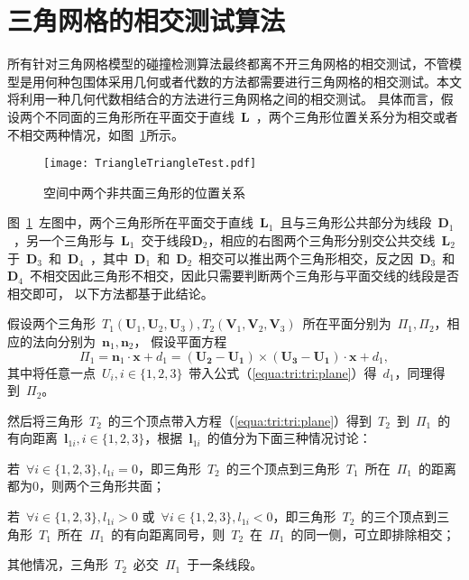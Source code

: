 \section{三角网格的相交测试算法}
\label{sec:intersection:triangles}

所有针对三角网格模型的碰撞检测算法最终都离不开三角网格的相交测试，不管模型是用何种包围体采用几何或者代数的方法都需要进行三角网格的相交测试。本文将利用一种几何代数相结合的方法进行三角网格之间的相交测试。
具体而言，假设两个不同面的三角形所在平面交于直线~$\bm{L}$~，两个三角形位置关系分为相交或者不相交两种情况，如图~\ref{fig:two:triangle:ui}所示。

\begin{figure}[H]
  \centering
    \texttt{[image: TriangleTriangleTest.pdf]}
    \caption{空间中两个非共面三角形的位置关系\cite{Moller1997}}
  \label{fig:two:triangle:ui}
\end{figure}

图~\ref{fig:two:triangle:ui}~左图中，两个三角形所在平面交于直线~$\bm{L}_1$~且与三角形公共部分为线段~$\bm{D}_1$~，另一个三角形与~$\bm{L}_1$~交于线段$\bm{D}_2$，相应的右图两个三角形分别交公共交线~$\bm{L}_2$~
于~$\bm{D}_3$~和~$\bm{D}_4$~，其中~$\bm{D}_1$~和~$\bm{D}_2$~相交可以推出两个三角形相交，反之因~$\bm{D}_3$~和~$\bm{D}_4$~不相交因此三角形不相交，因此只需要判断两个三角形与平面交线的线段是否相交即可\cite{Moller1997}，
以下方法都基于此结论。

假设两个三角形~$T_1(\bm{U}_1,\bm{U}_2,\bm{U}_3), T_2(\bm{V}_1,\bm{V}_2,\bm{V}_3)$~所在平面分别为~$\Pi_1, \Pi_2$，相应的法向分别为~$\bm{n}_1, \bm{n}_2$，
假设平面方程~
\begin{equation}
  \Pi_1 = \bm{n}_1 \cdot \bm{x}+d_1 = (\bm{U_2} - \bm{U_1}) \times (\bm{U_3}-\bm{U_1})  \cdot \bm{x} + d_1,
\label{equa:tri:tri:plane}
\end{equation}
其中将任意一点~$U_i, i \in \{1,2,3\}$~带入公式（\ref{equa:tri:tri:plane}）得~$d_1$，同理得到~$\Pi_2$。

然后将三角形~$T_2$~的三个顶点带入方程（\ref{equa:tri:tri:plane}）得到~$T_2$~到~$\Pi_1$~的有向距离~$\bm{l}_{1i}, i \in \{1,2,3\}$，根据~$\bm{l}_{1i}$~的值分为下面三种情况讨论：\\ \indent
\begin{inparaenum}[(1)]
  \item 若~$\forall i \in \{1,2,3\}, l_{1i} = 0$，即三角形~$T_2$~的三个顶点到三角形~$T_1$~所在~$\Pi_1$~的距离都为$0$，则两个三角形共面；\\ \indent
  \item 若~$\forall i \in \{1,2,3\}, l_{1i} > 0$ 或~$\forall i \in \{1,2,3\}, l_{1i} < 0$，即三角形~$T_2$~的三个顶点到三角形~$T_1$~所在~$\Pi_1$~的有向距离同号，则~$T_2$~在~$\Pi_1$~的同一侧，可立即排除相交；\\ \indent
  \item 其他情况，三角形~$T_2$~必交~$\Pi_1$~于一条线段。
\end{inparaenum}


